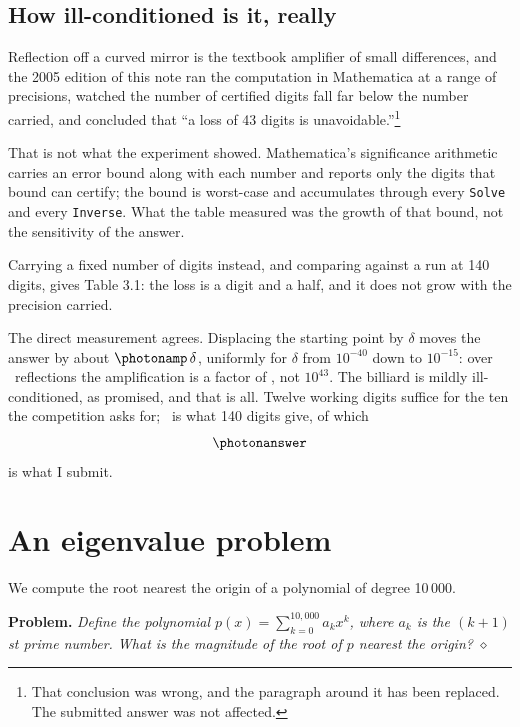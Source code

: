 \documentclass[11pt]{article}
\newcommand{\bp}{\mathbf{p}}
\newcommand{\diam}{\hfill$\diamond$}
\begin{document}
\subsection{How ill-conditioned is it, really}
Reflection off a curved mirror is the textbook amplifier of small
differences, and the 2005 edition of this note ran the computation in
Mathematica at a range of precisions, watched the number of certified digits
fall far below the number carried, and concluded that ``a loss of 43 digits
is unavoidable.''\footnote{That conclusion was wrong, and the paragraph
around it has been replaced. The submitted answer was not affected.}

That is not what the experiment showed. Mathematica's significance
arithmetic carries an error bound along with each number and reports only
the digits that bound can certify; the bound is worst-case and accumulates
through every \texttt{Solve} and every \texttt{Inverse}. What the table
measured was the growth of that bound, not the sensitivity of the answer.

Carrying a fixed number of digits instead, and comparing against a run at
140 digits, gives Table 3.1: the loss is a digit and a half, and it does not
grow with the precision carried.

\begin{table}[htb]
\centerline{}
\caption{Correct digits in $|\bp(60)|$ against working precision.}
\end{table}

The direct measurement agrees. Displacing the starting point by $\delta$
moves the answer by about $\photonamp\,\delta$, uniformly for $\delta$ from
$10^{-40}$ down to $10^{-15}$: over \photonbounces\ reflections the
amplification is a factor of \photonamp, not $10^{43}$. The billiard is
mildly ill-conditioned, as promised, and that is all. Twelve working digits
suffice for the ten the competition asks for; \photonlong\ is what 140
digits give, of which
\[
   \photonanswer
\]
is what I submit.

\section{An eigenvalue problem}
We compute the root nearest the origin of a polynomial of degree 10\,000.

\noindent\textbf{Problem.} \emph{Define the polynomial
$p(x) = \sum_{k=0}^{10,000} a_k x^k$, where $a_k$ is the $(k+1)$st prime
number. What is the magnitude of the root of $p$ nearest the origin?} \diam
\end{document}
